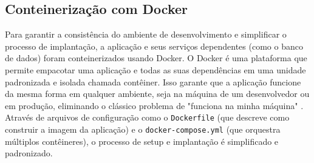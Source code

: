 \subsection{Conteinerização com Docker}

Para garantir a consistência do ambiente de desenvolvimento e simplificar o processo de implantação, a aplicação e seus serviços dependentes (como o banco de dados) foram conteinerizados usando Docker. O Docker é uma plataforma que permite empacotar uma aplicação e todas as suas dependências em uma unidade padronizada e isolada chamada contêiner. Isso garante que a aplicação funcione da mesma forma em qualquer ambiente, seja na máquina de um desenvolvedor ou em produção, eliminando o clássico problema de "funciona na minha máquina" \cite{docker2025overview}. Através de arquivos de configuração como o \texttt{Dockerfile} (que descreve como construir a imagem da aplicação) e o \texttt{docker-compose.yml} (que orquestra múltiplos contêineres), o processo de setup e implantação é simplificado e padronizado.